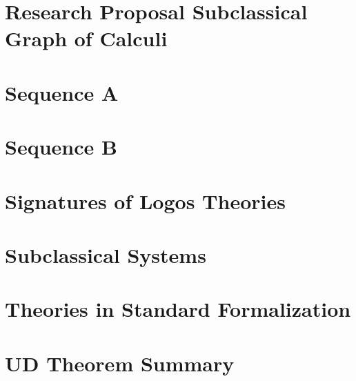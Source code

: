\documentclass{report}
\begin{document}
\chapter{Research Proposal Subclassical Graph of Calculi}

\chapter{Sequence A}

\chapter{Sequence B}

\chapter{Signatures of Logos Theories}

\chapter{Subclassical Systems}

\chapter{Theories in Standard Formalization}

\chapter{UD Theorem Summary}
\end{document}
